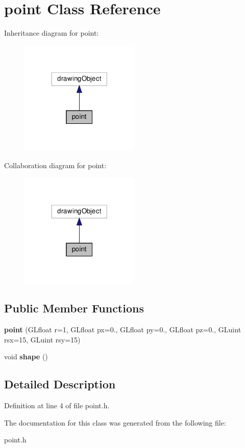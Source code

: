 \hypertarget{classpoint}{}\section{point Class Reference}
\label{classpoint}


Inheritance diagram for point\+:
\nopagebreak
\begin{figure}[H]
\begin{center}
\leavevmode
\includegraphics[width=161pt]{classpoint__inherit__graph}
\end{center}
\end{figure}


Collaboration diagram for point\+:
\nopagebreak
\begin{figure}[H]
\begin{center}
\leavevmode
\includegraphics[width=161pt]{classpoint__coll__graph}
\end{center}
\end{figure}
\subsection*{Public Member Functions}
\begin{DoxyCompactItemize}
\item 
\mbox{\label{classpoint_a5e1930bd8f6ebae2e840c1836b2e2875}} 
{\bfseries point} (G\+Lfloat r=1, G\+Lfloat px=0., G\+Lfloat py=0., G\+Lfloat pz=0., G\+Luint rsx=15, G\+Luint rsy=15)
\item 
\mbox{\label{classpoint_adb291571b18314e925e810f3a4340520}} 
void {\bfseries shape} ()
\end{DoxyCompactItemize}


\subsection{Detailed Description}


Definition at line 4 of file point.\+h.



The documentation for this class was generated from the following file\+:\begin{DoxyCompactItemize}
\item 
point.\+h\end{DoxyCompactItemize}
